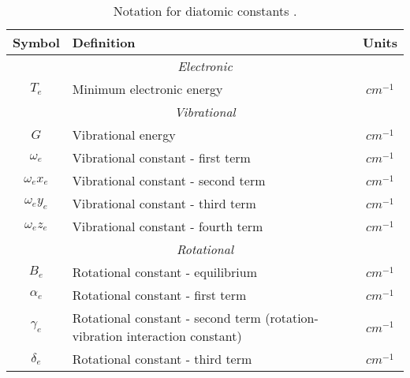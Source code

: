 \documentclass[11pt, twoside, fleqn]{report}
\begin{document}
\begin{table}[H]
    \centering
    \caption{Notation for diatomic constants \cite{herzberg:diatomic,nist:sigma1,nist:sigma3}.}
    \label{t:notation}
    \begin{tabular}{clc}
        \toprule
        Symbol            & Definition                                                                  & Units            \\
        \midrule
        \multicolumn{3}{c}{\textit{Electronic}}                                                                            \\
        \cmidrule(lr){1-3}
        $T_{e}$           & Minimum electronic energy                                                   & $\unit{cm^{-1}}$ \\
        \multicolumn{3}{c}{\textit{Vibrational}}                                                                           \\
        \cmidrule(lr){1-3}
        $G$               & Vibrational energy                                                          & $\unit{cm^{-1}}$ \\
        $\omega_{e}$      & Vibrational constant - first term                                           & $\unit{cm^{-1}}$ \\
        $\omega_{e}x_{e}$ & Vibrational constant - second term                                          & $\unit{cm^{-1}}$ \\
        $\omega_{e}y_{e}$ & Vibrational constant - third term                                           & $\unit{cm^{-1}}$ \\
        $\omega_{e}z_{e}$ & Vibrational constant - fourth term                                          & $\unit{cm^{-1}}$ \\
        \multicolumn{3}{c}{\textit{Rotational}}                                                                            \\
        \cmidrule(lr){1-3}
        $B_{e}$           & Rotational constant - equilibrium                                           & $\unit{cm^{-1}}$ \\
        $\alpha_{e}$      & Rotational constant - first term                                            & $\unit{cm^{-1}}$ \\
        $\gamma_{e}$      & Rotational constant - second term (rotation-vibration interaction constant) & $\unit{cm^{-1}}$ \\
        $\delta_{e}$      & Rotational constant - third term                                            & $\unit{cm^{-1}}$ \\

\end{tabular}
\end{table}
\end{document}
